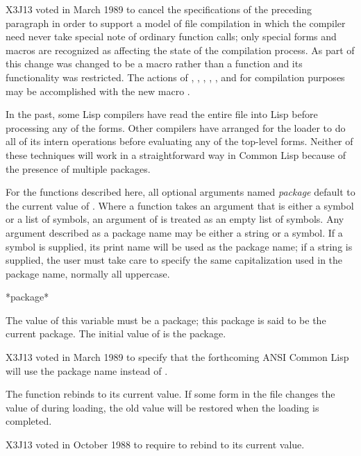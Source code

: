 \begin{newer}
X3J13 voted in March 1989 
to cancel the specifications of the preceding paragraph
in order to support a model of file compilation in which the
compiler need never take special note of ordinary function calls;
only special forms and macros are recognized as affecting the state
of the compilation process.
As part of this change  was changed to be a macro
rather than a function and its functionality was restricted.
The actions of
, , ,
, , and  for compilation
purposes may be accomplished with the new macro .
\end{newer}

\beforenoterule
\begin{implementation}
In the past, some Lisp compilers have read
the entire file into Lisp before processing any of the forms.  
Other compilers have arranged for
the loader to do all of its intern operations before evaluating any of the
top-level forms.  Neither of these techniques will work in a
straightforward way in Common Lisp because of the presence of multiple
packages.
\end{implementation}
\afternoterule

For the functions described here, all optional arguments named
{\it package} default to the current value of .  Where a
function takes an argument that is either a symbol or a list of symbols,
an argument of {\false} is treated as an empty list of symbols.  Any
argument described as a package name may be either a string or a symbol.
If a symbol is supplied, its print name will be used as the package
name; if a string is supplied, the user must take care to specify the
same capitalization used in the package name, normally all uppercase.

\begin{defun}[Variable]
*package*

The value of this variable must be a package; this package is said to be
the current package.  The initial value of  is the 
package.

\begin{newer}
X3J13 voted in March 1989  to specify that
the forthcoming ANSI Common Lisp will use the package name 
instead of .
\end{newer}

The function  rebinds  to its current value.  If
some form in the file changes the value of  during loading,
the old value will be restored when the loading is completed.

\begin{newer}
X3J13 voted in October 1988 
to require  to rebind  to its current value.
\end{newer}
\end{defun}


